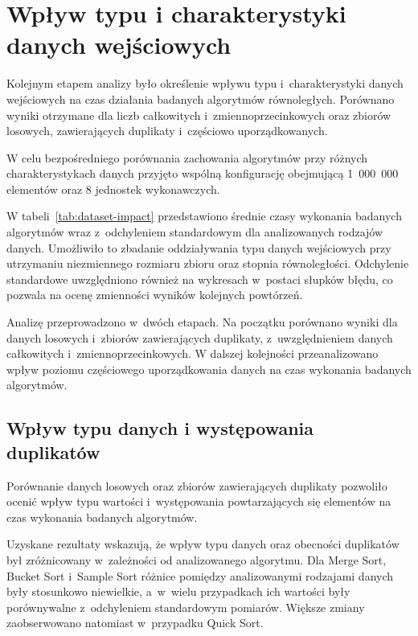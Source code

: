 \section{Wpływ typu i charakterystyki danych wejściowych}
\label{sec:CharakterystykaDanych}

Kolejnym etapem analizy było określenie wpływu typu i~charakterystyki danych wejściowych na czas działania badanych algorytmów równoległych.
Porównano wyniki otrzymane dla liczb całkowitych i~zmiennoprzecinkowych oraz zbiorów losowych, zawierających duplikaty i~częściowo uporządkowanych.

W celu bezpośredniego porównania zachowania algorytmów przy różnych charakterystykach danych przyjęto 
wspólną konfigurację obejmującą 1~000~000 elementów oraz 8 jednostek wykonawczych. 

W tabeli~\ref{tab:dataset-impact} przedstawiono średnie czasy wykonania badanych algorytmów wraz z~odchyleniem standardowym dla analizowanych rodzajów danych.
Umożliwiło to zbadanie oddziaływania typu danych wejściowych przy utrzymaniu niezmiennego rozmiaru zbioru oraz stopnia równoległości. 
Odchylenie standardowe uwzględniono również na wykresach w~postaci słupków błędu, co pozwala na ocenę zmienności wyników kolejnych powtórzeń.



Analizę przeprowadzono w~dwóch etapach. 
Na początku porównano wyniki dla danych losowych i~zbiorów zawierających duplikaty, z~uwzględnieniem danych całkowitych i~zmiennoprzecinkowych. 
W dalszej kolejności przeanalizowano wpływ poziomu częściowego uporządkowania danych na czas wykonania badanych algorytmów.

\subsection*{Wpływ typu danych i występowania duplikatów}

Porównanie danych losowych oraz zbiorów zawierających duplikaty pozwoliło ocenić wpływ typu wartości 
i~występowania powtarzających się elementów na czas wykonania badanych algorytmów.

Uzyskane rezultaty wskazują, że wpływ typu danych oraz obecności duplikatów był zróżnicowany w~zależności od analizowanego algorytmu.
Dla Merge Sort, Bucket Sort i~Sample Sort różnice pomiędzy analizowanymi rodzajami danych były stosunkowo niewielkie, a~w~wielu
przypadkach ich wartości były porównywalne z~odchyleniem standardowym pomiarów.
Większe zmiany zaobserwowano natomiast w~przypadku Quick Sort.

